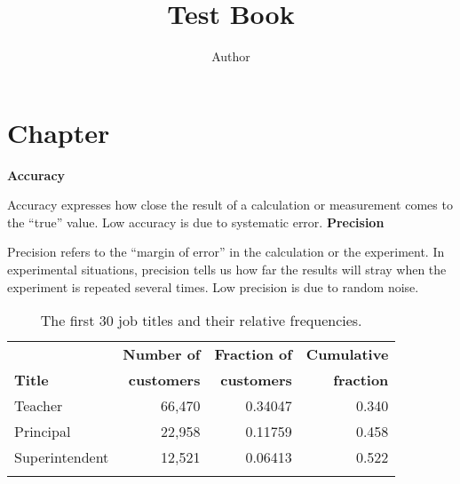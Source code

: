 \documentclass{book}
\title{Test Book}
\author{Author}
\newif\ifplastex
\begin{document}
\frontmatter

\ifplastex
    \usepackage{localdef}
    \maketitle

\else

\fi

\chapter{Chapter}

\newcommand{\tbl}[2]{#2\caption{#1}}

\newcommand{\mysubparagraph}[1]{\textbf{#1}\\}
\renewcommand{\subparagraph}{\mysubparagraph}

\begin{unnumlist}
\subparagraph{Accuracy}
\item {} Accuracy expresses how close the result of a calculation
  or measurement comes to the ``true'' value. Low accuracy is due to
  systematic error.
\subparagraph{Precision}  
\item Precision refers to the ``margin of error''  in the 
  calculation or the experiment. In experimental situations, precision
  tells us how far the results will stray when the experiment is 
  repeated several times. Low precision is due to random noise.
\end{unnumlist}


\begin{table}
\tbl{The first 30 job titles and their relative frequencies.\label{tbl:jobtitles}}{%
\begin{tabular}{lrrr}
\toprule
   & \textbf{Number of}
   & \textbf{Fraction of}
  & \textbf{Cumulative} \\
\textbf{Title} &  \textbf{customers} & \textbf{customers} & \textbf{fraction}\\
\colrule
Teacher \rule{0mm}{4mm}  & 66,470  &  0.34047   &   0.340 \\ 
Principal                & 22,958  &  0.11759   &   0.458 \\
Superintendent           & 12,521  &  0.06413   &   0.522 \\
\botrule
\end{tabular}}
\end{table}
\end{document}
